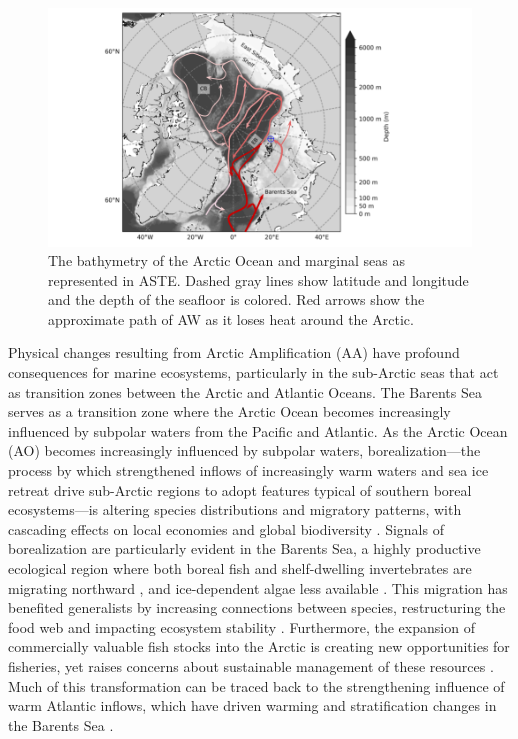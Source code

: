 \documentclass[draft]{agujournal2019}
\begin{document}
\begin{figure} %

    \includegraphics[width=\linewidth]{figs/Arctic_bathymetry.png}
    \caption{The bathymetry of the Arctic Ocean and marginal seas as represented in ASTE. Dashed gray lines show latitude and longitude and the depth of the seafloor is colored. Red arrows show the approximate path of AW as it loses heat around the Arctic.}
    \label{fig:wholeArctic}
    \vspace{-20pt}
\end{figure}

Physical changes resulting from Arctic Amplification (AA) have profound consequences for marine ecosystems, particularly in the sub-Arctic seas that act as transition zones between the Arctic and Atlantic Oceans. The Barents Sea serves as a transition zone where the Arctic Ocean becomes increasingly influenced by subpolar waters from the Pacific and Atlantic. As the Arctic Ocean (AO) becomes increasingly influenced by subpolar waters, borealization—the process by which strengthened inflows of increasingly warm waters and sea ice retreat drive sub-Arctic regions to adopt features typical of southern boreal ecosystems—is altering species distributions and migratory patterns, with cascading effects on local economies and global biodiversity \cite{Fossheim2015,Polyakov2020_borealization,Ingvaldsen2021,Husson2024}. Signals of borealization are particularly evident in the Barents Sea, a highly productive ecological region where both boreal fish \cite{Bergstad2018} and shelf-dwelling invertebrates are migrating northward \cite{Calvet2024}, and ice-dependent algae less available \cite{arrigo2008}. This migration has benefited generalists by increasing connections between species, restructuring the food web and impacting ecosystem stability \cite{Kortsch2015}. Furthermore, the expansion of commercially valuable fish stocks into the Arctic is creating new opportunities for fisheries, yet raises concerns about sustainable management of these resources \cite{jorgensen2020}. Much of this transformation can be traced back to the strengthening influence of warm Atlantic inflows, which have driven warming and stratification changes in the Barents Sea \cite{Polyakov2017,Lind2018}.
\end{document}
